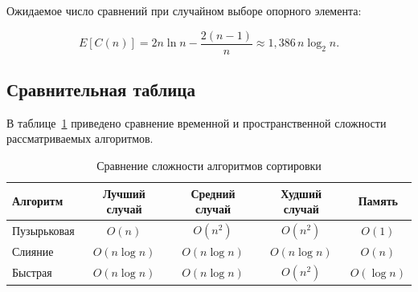 Ожидаемое число сравнений при случайном выборе опорного элемента:

\begin{equation}
    \label{eq:quicksort}
    E[C(n)] = 2n \ln n - \frac{2(n-1)}{n} \approx 1{,}386\, n \log_2 n.
\end{equation}

\subsection{Сравнительная таблица}

В таблице~\ref{tab:complexity} приведено сравнение временной и
пространственной сложности рассматриваемых алгоритмов.

\begin{table}[H]
    \centering
    \caption{Сравнение сложности алгоритмов сортировки}
    \label{tab:complexity}
    \begin{tabular}{|l|c|c|c|c|}
        \hline
        \textbf{Алгоритм} &
        \textbf{Лучший случай} &
        \textbf{Средний случай} &
        \textbf{Худший случай} &
        \textbf{Память} \\
        \hline
        Пузырьковая & $O(n)$        & $O(n^2)$      & $O(n^2)$      & $O(1)$        \\
        \hline
        Слияние     & $O(n \log n)$ & $O(n \log n)$ & $O(n \log n)$ & $O(n)$        \\
        \hline
        Быстрая     & $O(n \log n)$ & $O(n \log n)$ & $O(n^2)$      & $O(\log n)$   \\
        \hline
    \end{tabular}
\end{table}

